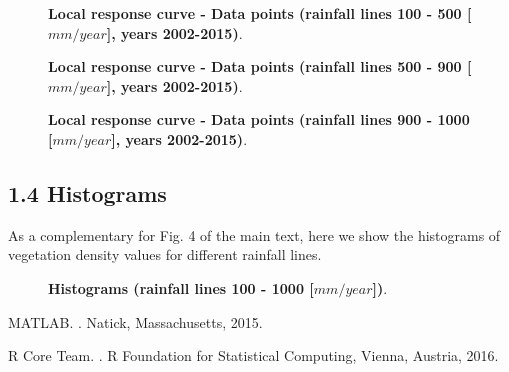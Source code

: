 \documentclass[aps,pre,twocolumn]{revtex4-1}
\begin{document}
\newpage
\pagebreak

\begin{figure}[H]
	
	
	\vspace{1.0pt}
	
	\caption{\textbf{Local response curve - Data points (rainfall lines 100 - 500 [$mm/year$], years 2002-2015)}.}
\end{figure}

\begin{figure}[H]
	

	\vspace{1.0pt}
	
	\caption{\textbf{Local response curve - Data points (rainfall lines 500 - 900 [$mm/year$], years 2002-2015)}.}
\end{figure}

\newpage
\pagebreak


\begin{figure}[H]
	
	
	\caption{\textbf{Local response curve - Data points (rainfall lines 900 - 1000 [$mm/year$], years 2002-2015)}.}
\end{figure}


\subsection*{1.4 Histograms} As a complementary for Fig. 4 of the main text, here we show the histograms of vegetation density values for different rainfall lines.
\newpage
\pagebreak
\begin{figure}[H]
	
	
	\vspace{1.0pt}
	
	\caption{\textbf{Histograms (rainfall lines 100 - 1000 [$mm/year$])}.}
\end{figure}


\begin{thebibliography}{sel}
MATLAB.
.
\newblock Natick, Massachusetts, 2015.

{R Core Team}.
.
\newblock R Foundation for Statistical Computing, Vienna, Austria, 2016.

\end{thebibliography}


\end{document}
